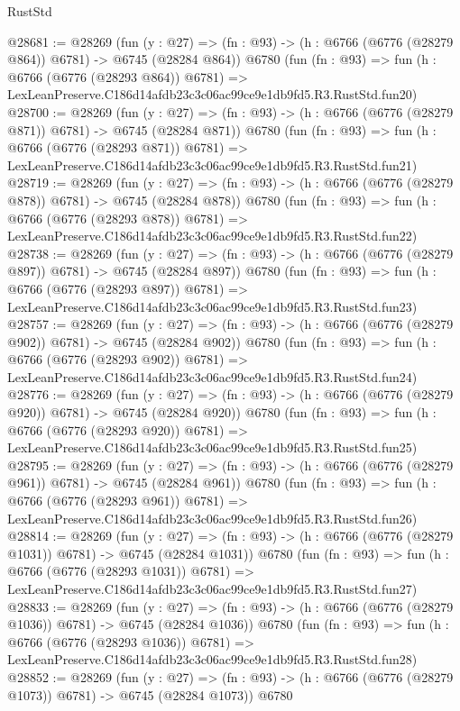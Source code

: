 \begin{lexlean}{RustStd}
\begin{coremodule}
@28681 := @28269
    (fun (y : @27) => (fn : @93) -> (h : @6766 (@6776 (@28279 @864)) @6781) -> @6745 (@28284 @864))
    @6780
    (fun (fn : @93) =>
    fun (h : @6766 (@6776 (@28293 @864)) @6781) =>
    LexLeanPreserve.C186d14afdb23c3c06ac99ce9e1db9fd5.R3.RustStd.fun20)
@28700 := @28269
    (fun (y : @27) => (fn : @93) -> (h : @6766 (@6776 (@28279 @871)) @6781) -> @6745 (@28284 @871))
    @6780
    (fun (fn : @93) =>
    fun (h : @6766 (@6776 (@28293 @871)) @6781) =>
    LexLeanPreserve.C186d14afdb23c3c06ac99ce9e1db9fd5.R3.RustStd.fun21)
@28719 := @28269
    (fun (y : @27) => (fn : @93) -> (h : @6766 (@6776 (@28279 @878)) @6781) -> @6745 (@28284 @878))
    @6780
    (fun (fn : @93) =>
    fun (h : @6766 (@6776 (@28293 @878)) @6781) =>
    LexLeanPreserve.C186d14afdb23c3c06ac99ce9e1db9fd5.R3.RustStd.fun22)
@28738 := @28269
    (fun (y : @27) => (fn : @93) -> (h : @6766 (@6776 (@28279 @897)) @6781) -> @6745 (@28284 @897))
    @6780
    (fun (fn : @93) =>
    fun (h : @6766 (@6776 (@28293 @897)) @6781) =>
    LexLeanPreserve.C186d14afdb23c3c06ac99ce9e1db9fd5.R3.RustStd.fun23)
@28757 := @28269
    (fun (y : @27) => (fn : @93) -> (h : @6766 (@6776 (@28279 @902)) @6781) -> @6745 (@28284 @902))
    @6780
    (fun (fn : @93) =>
    fun (h : @6766 (@6776 (@28293 @902)) @6781) =>
    LexLeanPreserve.C186d14afdb23c3c06ac99ce9e1db9fd5.R3.RustStd.fun24)
@28776 := @28269
    (fun (y : @27) => (fn : @93) -> (h : @6766 (@6776 (@28279 @920)) @6781) -> @6745 (@28284 @920))
    @6780
    (fun (fn : @93) =>
    fun (h : @6766 (@6776 (@28293 @920)) @6781) =>
    LexLeanPreserve.C186d14afdb23c3c06ac99ce9e1db9fd5.R3.RustStd.fun25)
@28795 := @28269
    (fun (y : @27) => (fn : @93) -> (h : @6766 (@6776 (@28279 @961)) @6781) -> @6745 (@28284 @961))
    @6780
    (fun (fn : @93) =>
    fun (h : @6766 (@6776 (@28293 @961)) @6781) =>
    LexLeanPreserve.C186d14afdb23c3c06ac99ce9e1db9fd5.R3.RustStd.fun26)
@28814 := @28269
    (fun (y : @27) =>
    (fn : @93) -> (h : @6766 (@6776 (@28279 @1031)) @6781) -> @6745 (@28284 @1031))
    @6780
    (fun (fn : @93) =>
    fun (h : @6766 (@6776 (@28293 @1031)) @6781) =>
    LexLeanPreserve.C186d14afdb23c3c06ac99ce9e1db9fd5.R3.RustStd.fun27)
@28833 := @28269
    (fun (y : @27) =>
    (fn : @93) -> (h : @6766 (@6776 (@28279 @1036)) @6781) -> @6745 (@28284 @1036))
    @6780
    (fun (fn : @93) =>
    fun (h : @6766 (@6776 (@28293 @1036)) @6781) =>
    LexLeanPreserve.C186d14afdb23c3c06ac99ce9e1db9fd5.R3.RustStd.fun28)
@28852 := @28269
    (fun (y : @27) =>
    (fn : @93) -> (h : @6766 (@6776 (@28279 @1073)) @6781) -> @6745 (@28284 @1073))
    @6780

\end{coremodule}
\end{lexlean}
